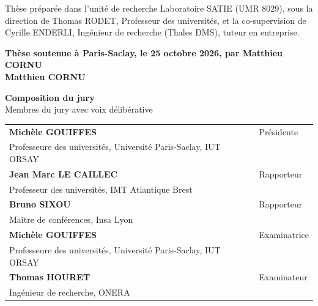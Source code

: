 \documentclass[french,12pt,a4paper]{book}
\begin{document}
\begin{titlepage}
\footnotesize Thèse préparée dans l'unité de recherche Laboratoire SATIE (UMR 8029), sous la direction de Thomas RODET, Professeur des universités, et la co-supervision de Cyrille ENDERLI, Ingénieur de recherche (Thales DMS), tuteur en entreprise. \\
\vspace{15mm}

\textbf{Thèse soutenue à Paris-Saclay, le 25 octobre 2026, par Matthieu CORNU}\\
\bigskip
\Large {\color{Prune} \textbf{Matthieu CORNU}}

\vspace{\fill} %

\bigskip

\flushleft
\small {\color{Prune} \textbf{Composition du jury}}\\
{\color{Prune} \scriptsize {Membres du jury avec voix délibérative}} \\
\vspace{2mm}
\scriptsize
\begin{tabular}{|p{7cm}l}
\arrayrulecolor{Prune}
\textbf{Michèle GOUIFFES} &   Présidente\\ 
Professeure des universités, Université Paris-Saclay, IUT ORSAY & \\
\textbf{Jean Marc LE CAILLEC} &  Rapporteur \\ 
Professeur des universités, IMT Atlantique Brest   &   \\ 
\textbf{Bruno SIXOU} &  Rapporteur \\ 
Maître de conférences, Insa Lyon  &   \\ 
\textbf{Michèle GOUIFFES} &  Examinatrice \\ 
Professeure des universités, Université Paris-Saclay, IUT ORSAY &   \\ 
\textbf{Thomas HOURET} &  Examinateur \\ 
Ingénieur de recherche, ONERA   &   \\ 
 

\end{tabular} 

\end{titlepage}


\thispagestyle{empty}
\end{document}
